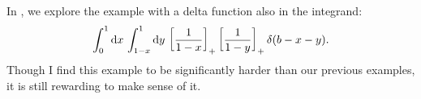 \begin{subappendices}
In , we explore the example with a delta function also in the integrand:
\begin{align}
    \int_{0}^{1} \dd x\,
    \int_{1-x}^{1} \dd y\,
    \le[\frac{1}{1-x}\ri]_+
    \le[\frac{1}{1-y}\ri]_+
    \delta(b - x - y)
    \label{eq:two-plus_one-delta}
    .
\end{align}
%
Though I find this example to be significantly harder than our previous examples, it is still rewarding to make sense of it.



\end{subappendices}

\addnewlinetotoc{}  %
\clearpage{}        %


